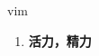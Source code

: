 
\begin{frame}
{\huge vim}
\begin{center}
\begin{enumerate}\Large
  \item \textbf{活力，精力}
\end{enumerate}
\end{center}
\end{frame}
